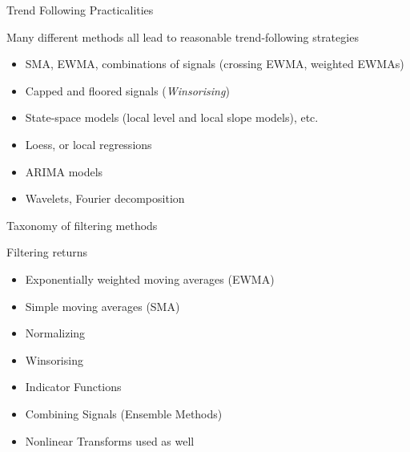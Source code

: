 \begin{frame} {Trend Following Practicalities }
\begin{alertblock}{Many different methods all lead  to reasonable trend-following strategies}
\begin{itemize}
    \item SMA, EWMA, combinations of signals (crossing EWMA, weighted EWMAs)
    \item Capped and floored signals  ({\sl Winsorising}) 
    \item State-space models (local level and local slope models), etc.  
    \item Loess, or local regressions 
    \item ARIMA models
    \item Wavelets, Fourier decomposition
\end{itemize}

\end{alertblock}
\end{frame}


\begin{frame}{Taxonomy of filtering methods}
    
\begin{alertblock}{Filtering returns}
\begin{itemize}  
    \item Exponentially weighted moving averages (EWMA)
    \item Simple moving averages (SMA)
    \item Normalizing 
    \item Winsorising
    \item Indicator Functions
    \item Combining Signals (Ensemble Methods)
    \item Nonlinear Transforms used as well
\end{itemize}
\end{alertblock}
\end{frame} 

